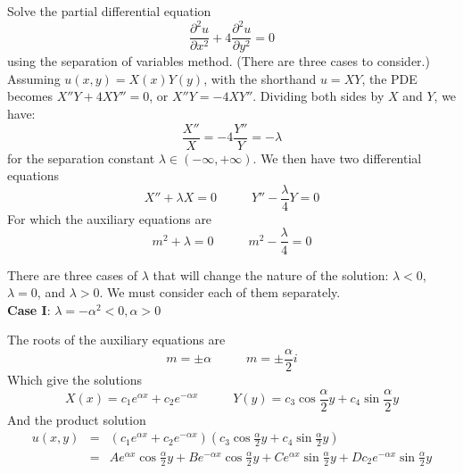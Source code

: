 \documentclass[11pt]{article}
\begin{document}
\vspace{0.1in}

Solve the partial differential equation
\begin{equation*}
\frac{ \partial^2 u}{ \partial x^2 } + 4 \frac{ \partial^2 u}{ \partial y^2} = 0
\end{equation*}
using the separation of variables method. (There are three cases to consider.) \\

Assuming $u(x,y) = X(x)Y(y)$, with the shorthand $u = XY$, the PDE becomes $X''Y + 4XY'' = 0$, or $X''Y = -4XY''$. Dividing both sides by $X$ and $Y$, we have:
\begin{equation*}
\frac{X''}{X} = -4 \frac{Y''}{Y} = - \lambda
\end{equation*}
for the separation constant $\lambda \in (-\infty, +\infty)$. We then have two differential equations
\begin{equation*}
X'' + \lambda X = 0 \;\;\;\;\;\;\;\;\;\; Y'' - \frac{\lambda}{4} Y = 0
\end{equation*}
For which the auxiliary equations are
\begin{equation*}
m^2 + \lambda = 0 \;\;\;\;\;\;\;\;\;\; m^2 - \frac{\lambda}{4} = 0
\end{equation*}

There are three cases of $\lambda$ that will change the nature of the solution: $\lambda < 0$, $\lambda = 0$, and $\lambda > 0$. We must consider each of them separately. \\

\textbf{Case I}: $\lambda = - \alpha^2 < 0, \alpha > 0$

The roots of the auxiliary equations are
\begin{equation*}
m = \pm \alpha \;\;\;\;\;\;\;\;\;\; m = \pm \frac{\alpha}{2} i
\end{equation*}
Which give the solutions
\begin{equation*}
X(x) = c_1 e^{\alpha x} + c_2 e^{-\alpha x} \;\;\;\;\;\;\;\;\;\; Y(y) = c_3 \cos \frac{\alpha}{2} y + c_4 \sin \frac{\alpha}{2} y
\end{equation*}
And the product solution
\begin{eqnarray*}
u(x,y) &=& \left( c_1 e^{\alpha x} + c_2 e^{-\alpha x} \right) \left( c_3 \cos \frac{\alpha}{2} y + c_4 \sin \frac{\alpha}{2} y \right) \\
	&=& A e^{\alpha x} \cos \frac{\alpha}{2} y + B e^{-\alpha x} \cos \frac{\alpha}{2} y + C e^{\alpha x} \sin \frac{\alpha}{2} y + D c_2 e^{-\alpha x} \sin \frac{\alpha}{2} y
\end{eqnarray*}
\end{document}
